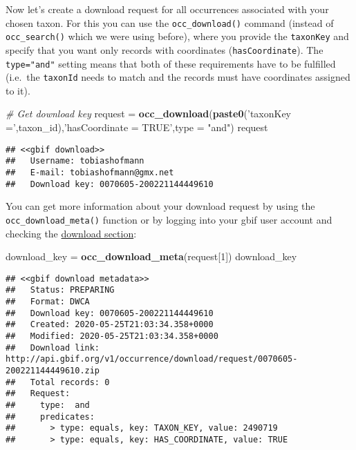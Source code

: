 \documentclass[]{article}
\newenvironment{Shaded}{\begin{snugshade}}{\end{snugshade}}
\newcommand{\CommentTok}[1]{\textcolor[rgb]{0.56,0.35,0.01}{\textit{#1}}}
\newcommand{\DataTypeTok}[1]{\textcolor[rgb]{0.13,0.29,0.53}{#1}}
\newcommand{\DecValTok}[1]{\textcolor[rgb]{0.00,0.00,0.81}{#1}}
\newcommand{\KeywordTok}[1]{\textcolor[rgb]{0.13,0.29,0.53}{\textbf{#1}}}
\newcommand{\NormalTok}[1]{#1}
\newcommand{\StringTok}[1]{\textcolor[rgb]{0.31,0.60,0.02}{#1}}
\begin{document}
Now let's create a download request for all occurrences associated with
your chosen taxon. For this you can use the \texttt{occ\_download()}
command (instead of \texttt{occ\_search()} which we were using before),
where you provide the \texttt{taxonKey} and specify that you want only
records with coordinates (\texttt{hasCoordinate}). The
\texttt{type="and"} setting means that both of these requirements have
to be fulfilled (i.e.~the \texttt{taxonId} needs to match and the
records must have coordinates assigned to it).

\begin{Shaded}
\begin{Highlighting}[]
\CommentTok{# Get download key}
\NormalTok{request =}\StringTok{ }\KeywordTok{occ_download}\NormalTok{(}\KeywordTok{paste0}\NormalTok{(}\StringTok{'taxonKey ='}\NormalTok{,taxon_id),}\StringTok{'hasCoordinate = TRUE'}\NormalTok{,}\DataTypeTok{type =} \StringTok{"and"}\NormalTok{)}
\NormalTok{request}
\end{Highlighting}
\end{Shaded}

\begin{verbatim}
## <<gbif download>>
##   Username: tobiashofmann
##   E-mail: tobiashofmann@gmx.net
##   Download key: 0070605-200221144449610
\end{verbatim}

You can get more information about your download request by using the
\texttt{occ\_download\_meta()} function or by logging into your gbif
user account and checking the
\href{https://www.gbif.org/user/download}{download section}:

\begin{Shaded}
\begin{Highlighting}[]
\NormalTok{download_key =}\StringTok{ }\KeywordTok{occ_download_meta}\NormalTok{(request[}\DecValTok{1}\NormalTok{])}
\NormalTok{download_key}
\end{Highlighting}
\end{Shaded}

\begin{verbatim}
## <<gbif download metadata>>
##   Status: PREPARING
##   Format: DWCA
##   Download key: 0070605-200221144449610
##   Created: 2020-05-25T21:03:34.358+0000
##   Modified: 2020-05-25T21:03:34.358+0000
##   Download link: http://api.gbif.org/v1/occurrence/download/request/0070605-200221144449610.zip
##   Total records: 0
##   Request: 
##     type:  and
##     predicates: 
##       > type: equals, key: TAXON_KEY, value: 2490719
##       > type: equals, key: HAS_COORDINATE, value: TRUE
\end{verbatim}
\end{document}
